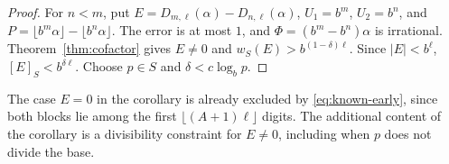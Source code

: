 \begin{proof}
For $n<m$, put $E=D_{m,\ell}(\alpha)-D_{n,\ell}(\alpha)$, $U_1=b^m$, $U_2=b^n$, and $P=\lfloor b^m\alpha\rfloor-\lfloor b^n\alpha\rfloor$. The error is at most $1$, and $\Phi=(b^m-b^n)\alpha$ is irrational. Theorem~\ref{thm:cofactor} gives $E\ne0$ and $w_S(E)>b^{(1-\delta)\ell}$. Since $|E|<b^\ell$, $[E]_S<b^{\delta\ell}$. Choose $p\in S$ and $\delta<c\log_b p$.
\end{proof}

The case $E=0$ in the corollary is already excluded by \eqref{eq:known-early}, since both blocks lie among the first $\lfloor (A+1)\ell\rfloor$ digits. The additional content of the corollary is a divisibility constraint for $E\ne0$, including when $p$ does not divide the base.
